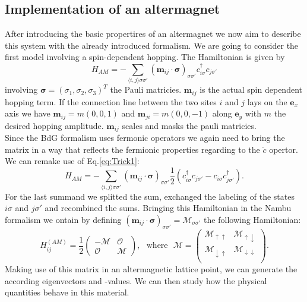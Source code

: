 \documentclass[../main.tex]{main.tex}
\begin{document}
\subsection{Implementation of an altermagnet}
After introducing the basic propertires of an altermagnet we now aim to describe this system with the already introduced formalism.
We are going to consider the first model involving a spin-dependent hopping. The Hamiltonian is given by
\begin{equation*}
    H_{AM} = -\sum_{\langle i, j\rangle\sigma\sigma'} \left(\bm{m}_{ij} \cdot \bm{\sigma}\right)_{\sigma\sigma'} c_{i\sigma}^{\dagger} c_{j\sigma'} 
\end{equation*}
involving $\bm{\sigma}=(\sigma_1, \sigma_2,\sigma_3)^T$ the Pauli matricies. $\bm{m}_{ij}$ is the actual spin dependent hopping term. If the connection line 
between the two sites $i$ and $j$ lays on the $\bm{e}_x$ axis we have $\bm{m}_{ij} = m(0,0,1)$ and $\bm{m}_{ji} = m(0,0,-1)$ along $\bm{e}_y$ with $m$ 
the desired hopping amplitude. $\bm{m}_{ij}$ scales and masks the pauli matricies.\\

Since the BdG formalism uses fermonic operators we again need to bring the matrix in a way that reflects the fermionic properties regarding to the $\check{c}$ opertor.
We can remake use of Eq.\ref{eq:Trick1}:
\begin{equation*}
    H_{AM} = -\sum_{\langle i, j\rangle\sigma\sigma'} \left(\bm{m}_{ij} \cdot \bm{\sigma}\right)_{\sigma\sigma'} \frac{1}{2}\left(c_{i\sigma}^{\dagger} c_{j\sigma'} - c_{i\sigma}c_{j\sigma'}^{\dagger}\right).
\end{equation*}
For the last summand we splitted the sum, exchanged the labeling of the states $i\sigma$ and $j\sigma'$ and recombined the sums.
Bringing this Hamiltonian in the Nambu formalism we ontain by defining
$\left(\bm{m}_{ij} \cdot \bm{\sigma}\right)_{\sigma\sigma'} = \mathcal{M}_{\sigma\sigma'}$ 
the following Hamiltonian:
\begin{equation*}
    H^{(AM)}_{ij} = \frac{1}{2}\begin{pmatrix}
        -\mathcal{M} & \mathcal{O}\\
        \mathcal{O} & \mathcal{M}
    \end{pmatrix}
    ,~~~ \text{where} ~~~ \mathcal{M} = \begin{pmatrix}
        \mathcal{M}_{\uparrow\uparrow} & \mathcal{M}_{\uparrow\downarrow}\\
        \mathcal{M}_{\downarrow\uparrow} & \mathcal{M}_{\downarrow\downarrow}\\
    \end{pmatrix}.
\end{equation*}
Making use of this matrix in an altermagnetic lattice point, we can generate the according eigenvectors and -values. We can then study how the physical quantities 
behave in this material.\\
\end{document}

